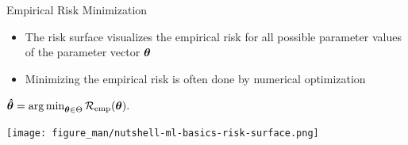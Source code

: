 \documentclass[11pt,compress,t,notes=noshow, xcolor=table]{beamer}
\begin{document}
\begin{vbframe}{Empirical Risk Minimization}

\begin{itemize}
\item \small The risk surface visualizes the empirical risk for all possible parameter values of the parameter vector $\bm{\theta}$
\item \small Minimizing the empirical risk is often done by numerical optimization
\end{itemize}

\begin{center}
$
\bm{\hat\theta} = \mathop{\mathrm{arg\,min}}_{\bm{\theta} \in \Theta} \mathcal{R}_{\text{emp}}(\bm{\theta}).
$
\end{center}


\begin{center}
 \texttt{[image: figure\_man/nutshell-ml-basics-risk-surface.png]}
\end{center}





\end{vbframe}
\end{document}
